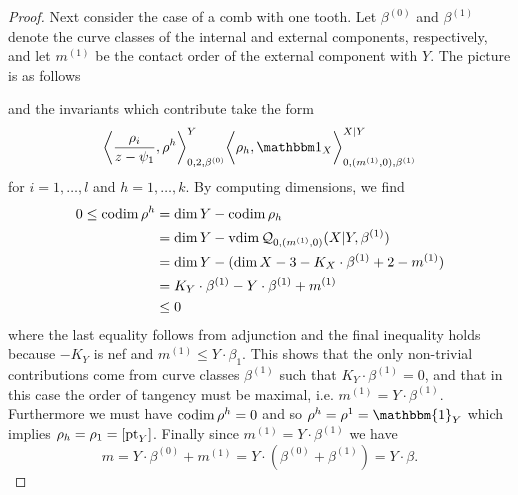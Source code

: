 \begin{proof}
Next consider the case of a comb with one tooth. Let $\beta^{(0)}$ and $\beta^{(1)}$ denote the curve classes of the internal and external components, respectively, and let $m^{(1)}$ be the contact order of the external component with $Y$. The picture is as follows
\begin{center}
\end{center}
and the invariants which contribute take the form
\begin{equation*} \bigg\langle \dfrac{\rho_i}{z-\psi_1},\rho^h\bigg\rangle_{0,2,\beta^{(0)}}^Y \bigg\langle \rho_h, \mathbbm 1_{X}\bigg\rangle_{0,(m^{(1)},0),\beta^{(1)}}^{X|Y} \end{equation*}
for $i = 1, \ldots, l$ and $h = 1, \ldots, k$. By computing dimensions, we find
\begin{align*}
0\leq \operatorname{codim} \rho^h &= \dim Y-\operatorname{codim} \rho_h \\
&= \dim Y-\operatorname{vdim} \mathcal{Q}_{0,(m^{(1)},0)}(X|Y,\beta^{(1)}) \\
&= \dim Y-(\dim X-3-K_{X}\cdot \beta^{(1)}+2-m^{(1)})\\
&= K_Y \cdot \beta^{(1)} - Y \cdot \beta^{(1)}+m^{(1)} \\
&\leq 0
\end{align*}
where the last equality follows from adjunction and the final inequality holds because $-K_Y$ is nef and $m^{(1)}\leq Y \cdot \beta_1$. This shows that the only non-trivial contributions come from curve classes $\beta^{(1)}$ such that $K_Y \cdot \beta^{(1)}=0$, and that in this case the order of tangency must be maximal, i.e. $m^{(1)}=Y \cdot \beta^{(1)}$. Furthermore we must have $\operatorname{codim} \rho^h = 0$ and so $\rho^h = \rho^1 = \mathbbm{1}_Y$ which implies $\rho_h = \rho_1 = [\operatorname{pt}_Y]$. Finally since $m^{(1)}=Y \cdot \beta^{(1)}$ we have
\begin{equation*} m = Y \cdot \beta^{(0)}+m^{(1)}=Y \cdot (\beta^{(0)} + \beta^{(1)}) = Y \cdot \beta. \end{equation*}

\end{proof}
